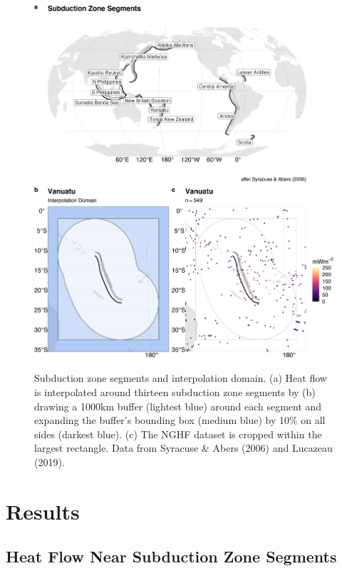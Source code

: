 \documentclass[draft,linenumbers]{agujournal2018}
\begin{document}
\begin{figure}[h]

{\centering \includegraphics[width=0.95\linewidth,]{../figs/base/segs_comp} 

}

\caption{Subduction zone segments and interpolation domain. (a) Heat flow is interpolated around thirteen subduction zone segments by (b) drawing a 1000km buffer (lightest blue) around each segment and expanding the buffer's bounding box (medium blue) by 10\% on all sides (darkest blue). (c) The NGHF dataset is cropped within the largest rectangle. Data from Syracuse \& Abers (2006) and Lucazeau (2019).}\label{fig:segments}
\end{figure}

\clearpage

\section{Results}

\subsection{Heat Flow Near Subduction Zone Segments}
\end{document}
